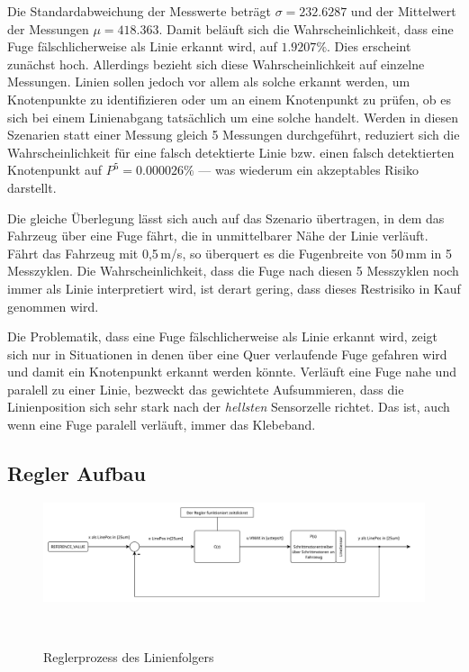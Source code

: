 \documentclass[main.tex]{subfiles} %
\begin{document}
Die Standardabweichung der Messwerte beträgt \(\sigma = 232.6287\) und der
Mittelwert der Messungen \(\mu = 418.363\). Damit beläuft sich die
Wahrscheinlichkeit, dass eine Fuge fälschlicherweise als Linie erkannt wird,
auf \(1.9207\%\). Dies erscheint zunächst hoch. Allerdings bezieht sich diese
Wahrscheinlichkeit auf einzelne Messungen. Linien sollen jedoch vor allem als
solche erkannt werden, um Knotenpunkte zu identifizieren oder um an einem
Knotenpunkt zu prüfen, ob es sich bei einem Linienabgang tatsächlich um eine
solche handelt. Werden in diesen Szenarien statt einer Messung gleich 5
Messungen durchgeführt, reduziert sich die Wahrscheinlichkeit für eine falsch
detektierte Linie bzw. einen falsch detektierten Knotenpunkt auf \(P^5 =
0.000026\%\) --- was wiederum ein akzeptables Risiko darstellt.

Die gleiche Überlegung lässt sich auch auf das Szenario übertragen, in dem das
Fahrzeug über eine Fuge fährt, die in unmittelbarer Nähe der Linie verläuft.
Fährt das Fahrzeug mit 0,5\,m/s, so überquert es die Fugenbreite von 50\,mm in
5 Messzyklen. Die Wahrscheinlichkeit, dass die Fuge nach diesen 5 Messzyklen
noch immer als Linie interpretiert wird, ist derart gering, dass dieses
Restrisiko in Kauf genommen wird.

Die Problematik, dass eine Fuge fälschlicherweise als Linie erkannt wird, zeigt
sich nur in Situationen in denen über eine Quer verlaufende Fuge gefahren wird
und damit ein Knotenpunkt erkannt werden könnte. Verläuft eine Fuge nahe und
paralell zu einer Linie, bezweckt das gewichtete Aufsummieren, dass die
Linienposition sich sehr stark nach der \textit{hellsten} Sensorzelle richtet.
Das ist, auch wenn eine Fuge paralell verläuft, immer das Klebeband.


\subsection*{Regler Aufbau}

\begin{figure}[H]
    \centering
    \includegraphics[width=1.0\linewidth]{fig_Parametrierung_Linienfolgeregler/RegelProzess_Linienfolger.pdf}
    \caption{Reglerprozess des Linienfolgers}~\label{fig:Linienfolger_RegelProzess}
\end{figure}
\end{document}
